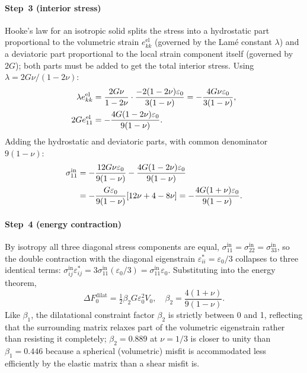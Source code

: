 \documentclass[3p]{elsarticle}
\newcommand{\dF}{\Delta F_0}
\newcommand{\half}{\tfrac{1}{2}}
\begin{document}
\paragraph{Step~3 (interior stress)}
Hooke's law for an isotropic solid splits the stress into a
hydrostatic part proportional to the volumetric strain $e_{kk}^\mathrm{el}$
(governed by the Lamé constant $\lambda$) and a deviatoric part
proportional to the local strain component itself (governed by
$2G$); both parts must be added to get the total interior stress.
Using $\lambda=2G\nu/(1-2\nu)$:
\begin{align}
  \lambda e_{kk}^\mathrm{el}
    &=\frac{2G\nu}{1-2\nu}\cdot\frac{-2(1-2\nu)\varepsilon_0}{3(1-\nu)}
    =-\frac{4G\nu\varepsilon_0}{3(1-\nu)},\notag\\
  2Ge_{11}^\mathrm{el}
    &=-\frac{4G(1-2\nu)\varepsilon_0}{9(1-\nu)}.
    \notag
\end{align}
Adding the hydrostatic and deviatoric parts, with common denominator
$9(1-\nu)$:
\begin{align}
  \sigma_{11}^\mathrm{in}&=-\frac{12G\nu\varepsilon_0}{9(1-\nu)}
    -\frac{4G(1-2\nu)\varepsilon_0}{9(1-\nu)}\notag\\
  &=-\frac{G\varepsilon_0}{9(1-\nu)}[12\nu+4-8\nu]
    =-\frac{4G(1+\nu)\varepsilon_0}{9(1-\nu)}.
    \label{eq:sig11in}
\end{align}

\paragraph{Step~4 (energy contraction)}
By isotropy all three diagonal stress components are equal,
$\sigma_{11}^\mathrm{in}=\sigma_{22}^\mathrm{in}=\sigma_{33}^\mathrm{in}$,
so the double contraction with the diagonal eigenstrain
$\varepsilon^*_{ii}=\varepsilon_0/3$ collapses to three identical
terms: $\sigma_{ij}^\mathrm{in}\varepsilon^*_{ij}
=3\sigma_{11}^\mathrm{in}(\varepsilon_0/3)=\sigma_{11}^\mathrm{in}\varepsilon_0$.
Substituting into the energy theorem,
\begin{equation}
  \boxed{\dF^\text{dilat}=\half\beta_2 G\varepsilon_0^2 V_0,\quad
  \beta_2=\frac{4(1+\nu)}{9(1-\nu)}.}
  \label{eq:Edilat}
\end{equation}
Like $\beta_1$, the dilatational constraint factor $\beta_2$ is
strictly between 0 and 1, reflecting that the surrounding matrix
relaxes part of the volumetric eigenstrain rather than resisting it
completely; $\beta_2=0.889$ at $\nu=1/3$ is closer to unity than
$\beta_1=0.446$ because a spherical (volumetric) misfit is
accommodated less efficiently by the elastic matrix than a shear
misfit is.
\end{document}
